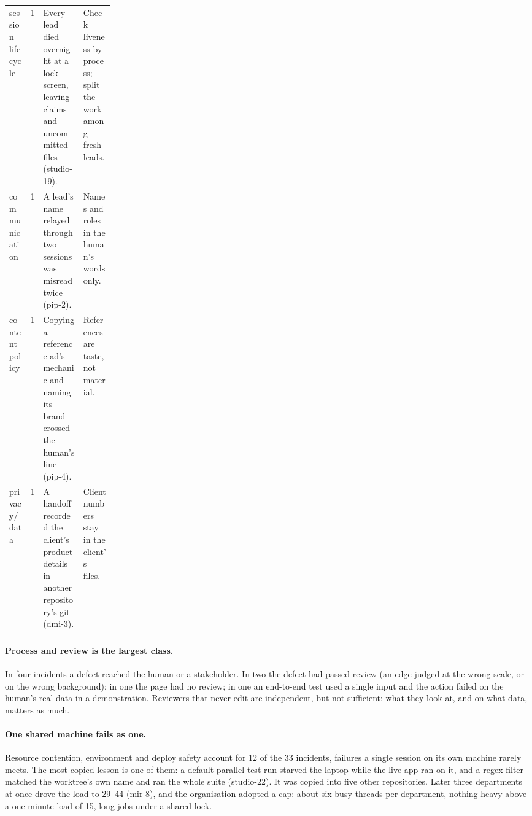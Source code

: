 \documentclass[11pt]{article}
\begin{document}
\begin{table}[t]
\begin{tabularx}{\linewidth}{@{}>{\raggedright\arraybackslash}p{0.2\linewidth}rYY@{}}
session lifecycle & 1 & Every lead died overnight at a lock screen, leaving claims and uncommitted files (studio-19). & Check liveness by process; split the work among fresh leads. \\ %
communication & 1 & A lead's name relayed through two sessions was misread twice (pip-2). & Names and roles in the human's words only. \\ %
content policy & 1 & Copying a reference ad's mechanic and naming its brand crossed the human's line (pip-4). & References are taste, not material. \\ %
privacy/data & 1 & A handoff recorded the client's product details in another repository's git (dmi-3). & Client numbers stay in the client's files. \\ %
\bottomrule
\end{tabularx}
\end{table}

\paragraph{Process and review is the largest class.}
In four incidents a defect reached the human or a stakeholder. In two the defect had %
passed review (an edge judged at the wrong scale, or on the wrong background); in one the %
page had no review; in one an end-to-end test used a single input and the action failed
on the human's real data in a demonstration. Reviewers that never edit are independent,
but not sufficient: what they look at, and on what data, matters as much.

\paragraph{One shared machine fails as one.}
Resource contention, environment and deploy safety account for 12 of the 33 incidents, %
failures a single session on its own machine rarely meets. The most-copied lesson is one
of them: a default-parallel test run starved the laptop while the live app ran on it, and
a regex filter matched the worktree's own name and ran the whole suite (studio-22). It was
copied into five other repositories. Later three departments at once drove the load to %
29--44 (mir-8), and the organisation adopted a cap: about six busy threads per %
department, nothing heavy above a one-minute load of 15, long jobs under a shared lock.
\end{document}
